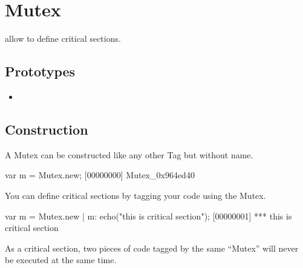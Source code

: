 \section{Mutex}

 allow to define critical sections.

\subsection{Prototypes}
\begin{itemize}
\item {}
\end{itemize}

\subsection{Construction}
A Mutex can be constructed like any other Tag but without name.

\begin{urbiscript}[firstnumber=1]
var m = Mutex.new;
[00000000] Mutex_0x964ed40
\end{urbiscript}

You can define critical sections by tagging your code using the Mutex.

\begin{urbiscript}[firstnumber=1]
var m = Mutex.new |
m: echo("this is critical section");
[00000001] *** this is critical section
\end{urbiscript}

As a critical section, two pieces of code tagged by the same ``Mutex''
will never be executed at the same time.

